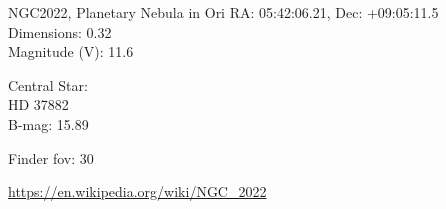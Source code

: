 \begin{block}{NGC2022, Planetary Nebula in Ori}
    RA: 05:42:06.21, Dec: +09:05:11.5 \\ 
    Dimensions: 0.32 \\ 
    Magnitude (V): 11.6

    Central Star: \\ 
      \hspace{1em}HD 37882 \\ 
      \hspace{1em}B-mag: 15.89 


    Finder fov: 30 

    \url{https://en.wikipedia.org/wiki/NGC_2022} 
\end{block}